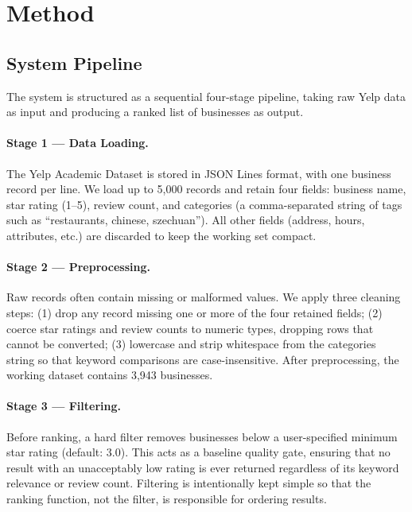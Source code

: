 

\section{Method}

\subsection{System Pipeline}

The system is structured as a sequential four-stage pipeline,
taking raw Yelp data as input and producing a ranked list of
businesses as output.

\paragraph{Stage 1 — Data Loading.}
The Yelp Academic Dataset is stored in JSON Lines format, with
one business record per line.
We load up to 5,000 records and retain four fields:
business name, star rating (1–5), review count, and categories
(a comma-separated string of tags such as ``restaurants, chinese, szechuan'').
All other fields (address, hours, attributes, etc.) are discarded
to keep the working set compact.

\paragraph{Stage 2 — Preprocessing.}
Raw records often contain missing or malformed values.
We apply three cleaning steps:
(1) drop any record missing one or more of the four retained fields;
(2) coerce star ratings and review counts to numeric types,
    dropping rows that cannot be converted;
(3) lowercase and strip whitespace from the categories string so
    that keyword comparisons are case-insensitive.
After preprocessing, the working dataset contains 3,943 businesses.

\paragraph{Stage 3 — Filtering.}
Before ranking, a hard filter removes businesses below a
user-specified minimum star rating (default: 3.0).
This acts as a baseline quality gate, ensuring that no result
with an unacceptably low rating is ever returned regardless of
its keyword relevance or review count.
Filtering is intentionally kept simple so that the ranking
function, not the filter, is responsible for ordering results.

